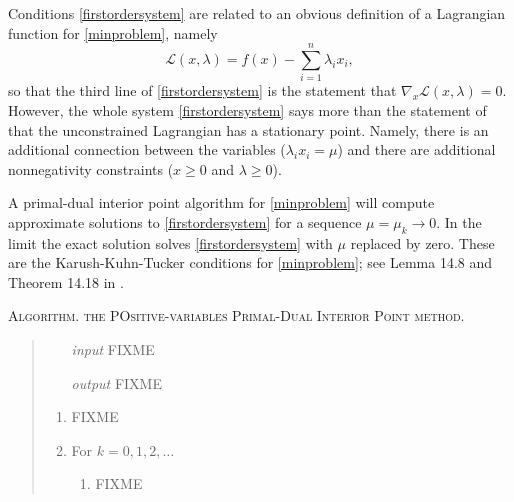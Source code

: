 \documentclass[11pt]{article}
\newcommand{\grad}{\nabla}
\begin{document}
Conditions \eqref{firstordersystem} are related to an obvious definition of a Lagrangian function for \eqref{minproblem}, namely
    $$\mathcal{L}(x,\lambda) = f(x) - \sum_{i=1}^n \lambda_i x_i,$$
so that the third line of \eqref{firstordersystem} is the statement that $\grad_x \mathcal{L}(x,\lambda)=0$.  However, the whole system \eqref{firstordersystem} says more than the statement of that the unconstrained Lagrangian has a stationary point.  Namely, there is an additional connection between the variables ($\lambda_i x_i = \mu$) and there are additional nonnegativity constraints ($x\ge 0$ and $\lambda\ge 0$).

A primal-dual interior point algorithm for \eqref{minproblem} will compute approximate solutions to \eqref{firstordersystem} for a sequence $\mu=\mu_k \to 0$.  In the limit the exact solution solves \eqref{firstordersystem} with $\mu$ replaced by zero.  These are the Karush-Kuhn-Tucker conditions for \eqref{minproblem}; see Lemma 14.8 and Theorem 14.18 in \cite{GrivaNashSofer2009}.



\bigskip
\noindent \textsc{Algorithm. the POsitive-variables Primal-Dual Interior Point method.}
\begin{quote}
\begin{itemize}
\item[\emph{input}]  FIXME
\item[\emph{output}]  FIXME
\end{itemize}
\renewcommand{\labelenumi}{\arabic{enumi}.}
\begin{enumerate}
\item FIXME
\item For $k=0,1,2,\dots$
    \renewcommand{\labelenumii}{(\alph{enumii})}
    \begin{enumerate}
    \item FIXME
    \end{enumerate}
\end{enumerate}
\end{quote}




\end{document}
